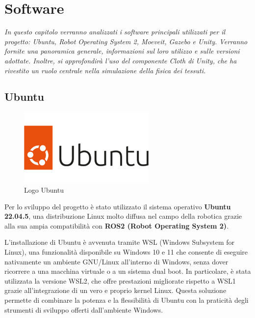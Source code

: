 \documentclass[11pt]{report}
\begin{document}
\section{Software}
\textit{In questo capitolo verranno analizzati i software principali utilizzati per il progetto: Ubuntu, Robot Operating System 2, Moeveit, Gazebo e Unity. Verranno fornite una panoramica generale, informazioni sul loro utilizzo e sulle versioni adottate. Inoltre, si approfondirà l'uso del componente Cloth di Unity, che ha rivestito un ruolo centrale nella simulazione della fisica dei tessuti.}

\subsection{Ubuntu}

\begin{figure}[H]
    \centering
    \includegraphics[width=0.6\textwidth]{images/ubuntu1.png}
    \caption{Logo Ubuntu}
    \label{fig:Ubuntu}
\end{figure}

Per lo sviluppo del progetto è stato utilizzato il sistema operativo \textbf{Ubuntu 22.04.5}, una distribuzione Linux molto diffusa nel campo della robotica grazie alla sua ampia compatibilità con \textbf{ROS2 (Robot Operating System 2)}.

L’installazione di Ubuntu è avvenuta tramite WSL (Windows Subsystem for Linux), una funzionalità disponibile su Windows 10 e 11 che consente di eseguire nativamente un ambiente GNU/Linux all’interno di Windows, senza dover ricorrere a una macchina virtuale o a un sistema dual boot.
In particolare, è stata utilizzata la versione WSL2, che offre prestazioni migliorate rispetto a WSL1 grazie all’integrazione di un vero e proprio kernel Linux. Questa soluzione permette di combinare la potenza e la flessibilità di Ubuntu con la praticità degli strumenti di sviluppo offerti dall’ambiente Windows.
\end{document}
